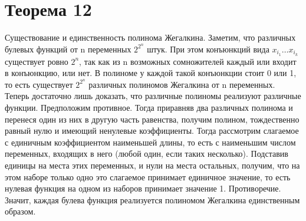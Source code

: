 \documentclass[12pt,a4paper]{scrartcl}
\begin{document}
\section*{Теорема 12}
Существование и единственность полинома Жегалкина.
Заметим, что различных булевых функций от n переменных $2^{2^n}$ штук.
При этом конъюнкций вида $x_{i_1} \ldots x_{i_k}$ существует ровно $2^n$, так как из
n возможных сомножителей каждый или входит в конъюнкцию, или нет. В полиноме у
каждой такой конъюнкции стоит 0 или 1, то есть существует $2^{2^n}$ различных
полиномов Жегалкина от n переменных.\\
Теперь достаточно лишь доказать, что различные полиномы реализуют различные функции.
Предположим противное. Тогда приравняв два различных полинома и перенеся один из них
в другую часть равенства, получим полином, тождественно равный нулю и имеющий ненулевые
коэффициенты. Тогда рассмотрим слагаемое с единичным коэффициентом наименьшей длины,
то есть с наименьшим числом переменных, входящих в него (любой один, если таких несколько).
Подставив единицы на места этих переменных, и нули на места остальных, получим,
что на этом наборе только одно это слагаемое принимает единичное значение, то
есть нулевая функция на одном из наборов принимает значение 1. Противоречие.
Значит, каждая булева функция реализуется полиномом Жегалкина единственным образом.
\end{document}
